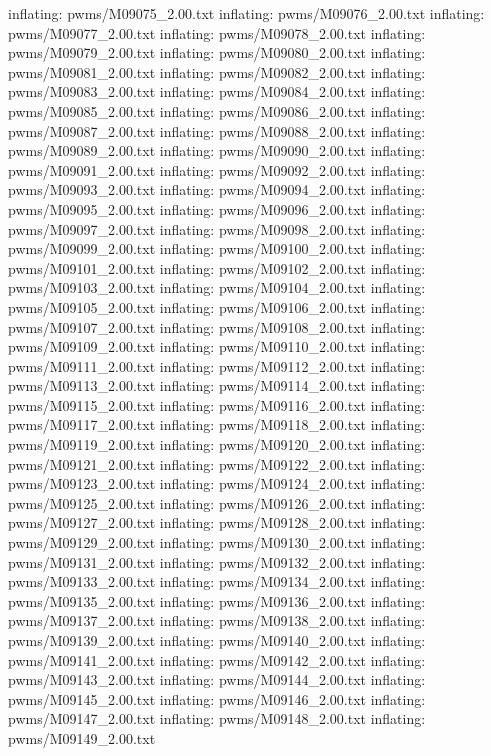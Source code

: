\documentclass[letterpaper,10pt,english]{sphinxmanual}
\begin{document}
{\begin{sphinxVerbatim}[commandchars=\\\{\}]
  inflating: pwms/M09075\_2.00.txt
  inflating: pwms/M09076\_2.00.txt
  inflating: pwms/M09077\_2.00.txt
  inflating: pwms/M09078\_2.00.txt
  inflating: pwms/M09079\_2.00.txt
  inflating: pwms/M09080\_2.00.txt
  inflating: pwms/M09081\_2.00.txt
  inflating: pwms/M09082\_2.00.txt
  inflating: pwms/M09083\_2.00.txt
  inflating: pwms/M09084\_2.00.txt
  inflating: pwms/M09085\_2.00.txt
  inflating: pwms/M09086\_2.00.txt
  inflating: pwms/M09087\_2.00.txt
  inflating: pwms/M09088\_2.00.txt
  inflating: pwms/M09089\_2.00.txt
  inflating: pwms/M09090\_2.00.txt
  inflating: pwms/M09091\_2.00.txt
  inflating: pwms/M09092\_2.00.txt
  inflating: pwms/M09093\_2.00.txt
  inflating: pwms/M09094\_2.00.txt
  inflating: pwms/M09095\_2.00.txt
  inflating: pwms/M09096\_2.00.txt
  inflating: pwms/M09097\_2.00.txt
  inflating: pwms/M09098\_2.00.txt
  inflating: pwms/M09099\_2.00.txt
  inflating: pwms/M09100\_2.00.txt
  inflating: pwms/M09101\_2.00.txt
  inflating: pwms/M09102\_2.00.txt
  inflating: pwms/M09103\_2.00.txt
  inflating: pwms/M09104\_2.00.txt
  inflating: pwms/M09105\_2.00.txt
  inflating: pwms/M09106\_2.00.txt
  inflating: pwms/M09107\_2.00.txt
  inflating: pwms/M09108\_2.00.txt
  inflating: pwms/M09109\_2.00.txt
  inflating: pwms/M09110\_2.00.txt
  inflating: pwms/M09111\_2.00.txt
  inflating: pwms/M09112\_2.00.txt
  inflating: pwms/M09113\_2.00.txt
  inflating: pwms/M09114\_2.00.txt
  inflating: pwms/M09115\_2.00.txt
  inflating: pwms/M09116\_2.00.txt
  inflating: pwms/M09117\_2.00.txt
  inflating: pwms/M09118\_2.00.txt
  inflating: pwms/M09119\_2.00.txt
  inflating: pwms/M09120\_2.00.txt
  inflating: pwms/M09121\_2.00.txt
  inflating: pwms/M09122\_2.00.txt
  inflating: pwms/M09123\_2.00.txt
  inflating: pwms/M09124\_2.00.txt
  inflating: pwms/M09125\_2.00.txt
  inflating: pwms/M09126\_2.00.txt
  inflating: pwms/M09127\_2.00.txt
  inflating: pwms/M09128\_2.00.txt
  inflating: pwms/M09129\_2.00.txt
  inflating: pwms/M09130\_2.00.txt
  inflating: pwms/M09131\_2.00.txt
  inflating: pwms/M09132\_2.00.txt
  inflating: pwms/M09133\_2.00.txt
  inflating: pwms/M09134\_2.00.txt
  inflating: pwms/M09135\_2.00.txt
  inflating: pwms/M09136\_2.00.txt
  inflating: pwms/M09137\_2.00.txt
  inflating: pwms/M09138\_2.00.txt
  inflating: pwms/M09139\_2.00.txt
  inflating: pwms/M09140\_2.00.txt
  inflating: pwms/M09141\_2.00.txt
  inflating: pwms/M09142\_2.00.txt
  inflating: pwms/M09143\_2.00.txt
  inflating: pwms/M09144\_2.00.txt
  inflating: pwms/M09145\_2.00.txt
  inflating: pwms/M09146\_2.00.txt
  inflating: pwms/M09147\_2.00.txt
  inflating: pwms/M09148\_2.00.txt
  inflating: pwms/M09149\_2.00.txt

\end{sphinxVerbatim}}
\end{document}
